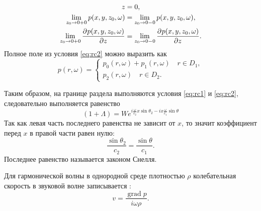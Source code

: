 \documentclass[a4paper, fontsize=14pt]{article}
\newcommand{\gradop}{\operatorname{grad}}
\begin{document}
	\begin{gather}
		z=0,\label{eq:rc1}\\
		\lim_{z_0\to 0+0} p(x,y,z_0,\omega) = \lim_{z_0\to 0-0} p(x,y,z_0,\omega), \label{eq:rc2}\\
		\lim_{z_0\to 0+0} \frac{\partial ^ {  } {p(x,y,z_0,\omega)}}{\partial {z} ^ {  } } = \lim_{z_0\to 0-0} \frac{\partial ^ {  } {p(x,y,z_0,\omega)}}{\partial {z} ^ {  } }.\label{eq:rc3}
	\end{gather}
	Полное поле из условия \eqref{eq:rc2} можно выразить как 
	\begin{equation}
		p(r,\omega) = \begin{cases}
			p_0(r,\omega)+p_1(r,\omega) \quad r\in D_1, \\
			p_2(r,\omega) \quad r \in D_2.
		\end{cases}
	\end{equation}
	
	Таким образом, на границе раздела выполняются условия \eqref{eq:rc1} и \eqref{eq:rc2}, следовательно выполняется равенство
	\begin{equation}
		(1+\Lambda)= W e^{i\frac{\omega}{c_2}x\sin \theta_2  - ix\frac{\omega}{c_1}\sin \theta}
	\end{equation}
	Так как левая часть последнего равенства не зависит от $x$, то значит  коэффициент перед  $x$ в правой части равен нулю:
	\begin{equation}
		\frac{\sin \theta_2}{c_2} = \frac{\sin \theta}{c_1}.
	\label{eq:snell}
	\end{equation}
	Последнее равенство называется законом Снелля.
	
	Для гармонической волны в однородной среде плотностью $\rho$ колебательная скорость в звуковой волне записывается \cite{landavshic}:
	\begin{equation}
		v = \frac{\gradop p}{i\omega \rho}.
	\end{equation}
	
\end{document}
